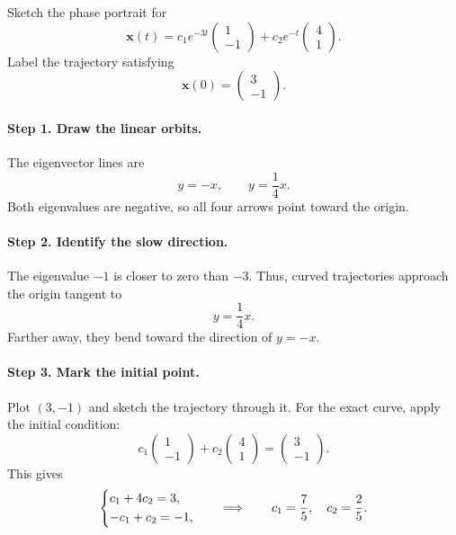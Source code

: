 \documentclass[10pt,letterpaper]{article}
\begin{document}
\begin{example}[2]{
Sketch the phase portrait for
\[
\mathbf{x}(t)
=c_1e^{-3t}\begin{pmatrix}1\\-1\end{pmatrix}
+c_2e^{-t}\begin{pmatrix}4\\1\end{pmatrix}.
\]
Label the trajectory satisfying
\[
\mathbf{x}(0)=\begin{pmatrix}3\\-1\end{pmatrix}.
\]
}

\paragraph{Step 1. Draw the linear orbits.}
The eigenvector lines are
\[
y=-x,\qquad y=\frac14x.
\]
Both eigenvalues are negative, so all four arrows
point toward the origin.

\paragraph{Step 2. Identify the slow direction.}
The eigenvalue $-1$ is closer to zero than $-3$.
Thus, curved trajectories approach the origin
tangent to
\[
y=\frac14x.
\]
Farther away, they bend toward the direction
of $y=-x$.

\paragraph{Step 3. Mark the initial point.}
Plot $(3,-1)$ and sketch the trajectory through it.
For the exact curve, apply the initial condition:
\[
c_1\begin{pmatrix}1\\-1\end{pmatrix}
+c_2\begin{pmatrix}4\\1\end{pmatrix}
=\begin{pmatrix}3\\-1\end{pmatrix}.
\]
This gives
\[
\begin{dcases}
c_1+4c_2=3,\\
-c_1+c_2=-1,
\end{dcases}
\qquad\Longrightarrow\qquad
c_1=\frac75,\quad c_2=\frac25.
\]


\end{example}
\end{document}
